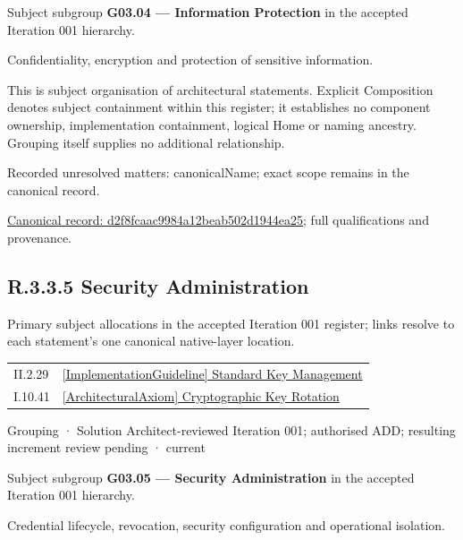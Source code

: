 Subject subgroup \textbf{G03.04 — Information Protection} in the accepted Iteration 001 hierarchy.



Confidentiality, encryption and protection of sensitive information.



This is subject organisation of architectural statements. Explicit Composition denotes subject containment within this register; it establishes no component ownership, implementation containment, logical Home or naming ancestry. Grouping itself supplies no additional relationship.


{\small Recorded unresolved matters: canonicalName; exact scope remains in the canonical record.}\par
{\footnotesize \href{../../../../continuum/grouping/d2f8fcaac9984a12beab502d1944ea25.md}{Canonical record: d2f8fcaac9984a12beab502d1944ea25}; full qualifications and provenance.}\par
\subsection*{R.3.3.5 Security Administration}
\label{navigation:R.3.3.5}

Primary subject allocations in the accepted Iteration 001 register; links resolve to each statement’s one canonical native-layer location.\par
\begin{longtable}{p{.22\linewidth}p{.73\linewidth}}
II.2.29 & \hyperref[element:bbedb1ff13e94a88ac7ec60b8e40092e]{[ImplementationGuideline] Standard Key Management} \\
I.10.41 & \hyperref[element:6df99d4979a942fe833e1c43317b385b]{[ArchitecturalAxiom] Cryptographic Key Rotation} \\
\end{longtable}
\label{element:84693ef7bb4a4ced9634737c6bd5a36d}
{\small Grouping · Solution Architect-reviewed Iteration 001; authorised ADD; resulting increment review pending · current}\par

Subject subgroup \textbf{G03.05 — Security Administration} in the accepted Iteration 001 hierarchy.



Credential lifecycle, revocation, security configuration and operational isolation.



